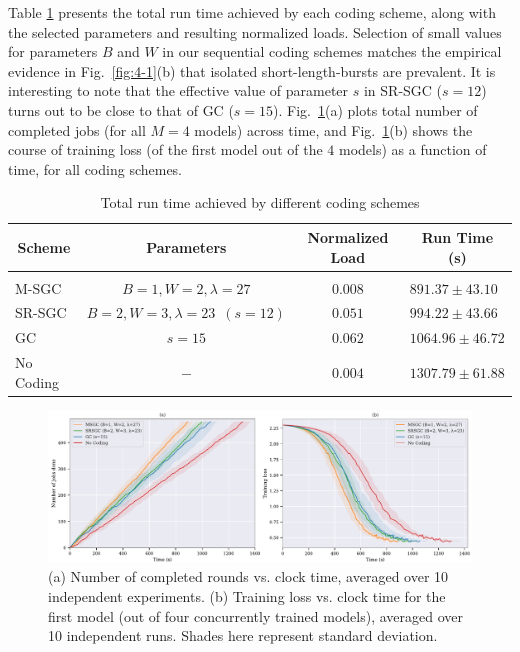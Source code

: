 Table \ref{table:4-1} presents the total run time achieved by each coding scheme, along with the selected parameters and resulting normalized loads.
Selection of small values for parameters $B$ and $W$ in our sequential coding schemes matches the empirical evidence in Fig.~\ref{fig:4-1}(b) that isolated short-length-bursts are prevalent. It is interesting to note that the effective value of parameter $s$ in SR-SGC ($s=12$) turns out to be close to that of GC ($s=15$).  Fig.~\ref{fig:4-2}(a) plots total number of completed jobs (for all $M=4$ models) across time, and Fig.~\ref{fig:4-2}(b) shows the course of training loss (of the first model out of the $4$ models) as a function of  time, for all coding schemes. 

\vspace{-0.5em}
\begin{table}[h]
\caption{Total run time achieved by different coding schemes} \label{table:4-1}
\vspace{-1em}
\begin{center}
\begin{tabular}{lccl}
\multicolumn{1}{c}{\bf Scheme}  &\multicolumn{1}{c}{\bf Parameters} &\multicolumn{1}{c}{\bf Normalized Load} &\multicolumn{1}{c}{\bf Run Time (s)} 
\\ \hline \\
M-SGC	   	&$B=1, W=2, \lambda=27$	&$0.008$    &$891.37 \pm 43.10 $\\
SR-SGC	   	&$B=2, W=3, \lambda=23 \; \ (s=12)$	&$0.051$    &$994.22 \pm 43.66 $\\
GC	       	&$s=15$	                &$0.062$    &$1064.96 \pm 46.72$ \\
No Coding	&$-$	                &$0.004$    &$1307.79 \pm 61.88$ 
\end{tabular}
\end{center}
\end{table}
\vspace{-1.5em}

\begin{figure}[h]
    \centering
    \includegraphics[width=\textwidth]{figures/ch2/fig2.pdf}
    \caption{(a) Number of completed rounds vs. clock time, averaged over 10 independent experiments. (b) Training loss vs. clock time for the first model (out of four concurrently trained models), averaged over 10 independent runs. Shades here represent standard deviation.}
    \label{fig:4-2}
\end{figure}

